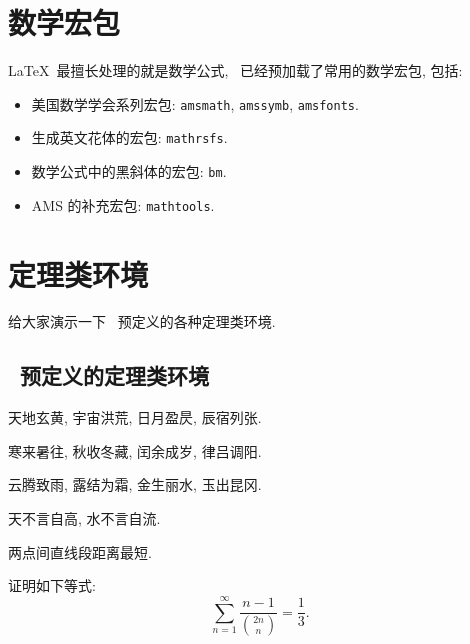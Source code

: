 {}
\label{cha:theorem}
\section{数学宏包}
\LaTeX\ 最擅长处理的就是数学公式, \shuthesis\ 已经预加载了常用的数学宏包, 包括:
\begin{itemize}
\item 美国数学学会系列宏包: \texttt{amsmath}, \texttt{amssymb}, \texttt{amsfonts}.
\item 生成英文花体的宏包: \texttt{mathrsfs}.
\item 数学公式中的黑斜体的宏包: \texttt{bm}.
\item AMS 的补充宏包: \texttt{mathtools}.
\end{itemize}

\section{定理类环境}
给大家演示一下 \shuthesis\ 预定义的各种定理类环境.

\subsection{\shuthesis\ 预定义的定理类环境}
\begin{assumption}
天地玄黄, 宇宙洪荒, 日月盈昃, 辰宿列张.
\end{assumption}

\begin{definition}
寒来暑往, 秋收冬藏, 闰余成岁, 律吕调阳.
\end{definition}

\begin{proposition}
云腾致雨, 露结为霜, 金生丽水, 玉出昆冈.
\end{proposition}

\begin{remark}
天不言自高, 水不言自流.
\end{remark}

\begin{axiom}
两点间直线段距离最短.  
\end{axiom}

\begin{lemma}
证明如下等式:
\[
\sum_{n=1}^{\infty}\frac{n-1}{\binom{2n}{n}}=\frac{1}{3}.
\]
\end{lemma}


